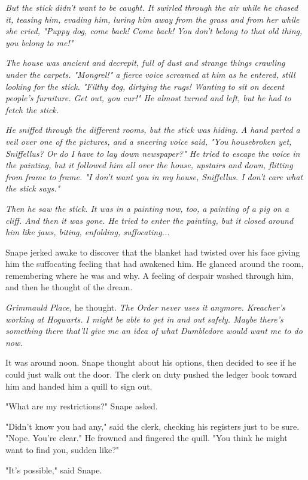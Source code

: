 \documentclass[a4paper,11pt]{article}
\begin{document}
\emph{But the stick didn't want to be caught. It swirled through the air while he chased it, teasing him, evading him, luring him away from the grass and from her while she cried, "Puppy dog, come back! Come back! You don't belong to that old thing, you belong to me!"}

\emph{The house was ancient and decrepit, full of dust and strange things crawling under the carpets. "Mongrel!" a fierce voice screamed at him as he entered, still looking for the stick. "Filthy dog, dirtying the rugs! Wanting to sit on decent people's furniture. Get out, you cur!" He almost turned and left, but he had to fetch the stick.}

\emph{He sniffed through the different rooms, but the stick was hiding. A hand parted a veil over one of the pictures, and a sneering voice said, "You housebroken yet, Sniffellus? Or do I have to lay down newspaper?" He tried to escape the voice in the painting, but it followed him all over the house, upstairs and down, flitting from frame to frame. "I don't want you in my house, Sniffellus. I don't care what the stick says."}

\emph{Then he saw the stick. It was in a painting now, too, a painting of a pig on a cliff. And then it was gone. He tried to enter the painting, but it closed around him like jaws, biting, enfolding, suffocating...}

Snape jerked awake to discover that the blanket had twisted over his face giving him the suffocating feeling that had awakened him. He glanced around the room, remembering where he was and why. A feeling of despair washed through him, and then he thought of the dream.

\emph{Grimmauld Place,} he thought. \emph{The Order never uses it anymore. Kreacher's working at Hogwarts. I might be able to get in and out safely. Maybe there's something there that'll give me an idea of what Dumbledore would want me to do now.}

It was around noon. Snape thought about his options, then decided to see if he could just walk out the door. The clerk on duty pushed the ledger book toward him and handed him a quill to sign out.

"What are my restrictions?" Snape asked.

"Didn't know you had any," said the clerk, checking his registers just to be sure. "Nope. You're clear." He frowned and fingered the quill. "You think he might want to find you, sudden like?"

"It's possible," said Snape.
\end{document}
